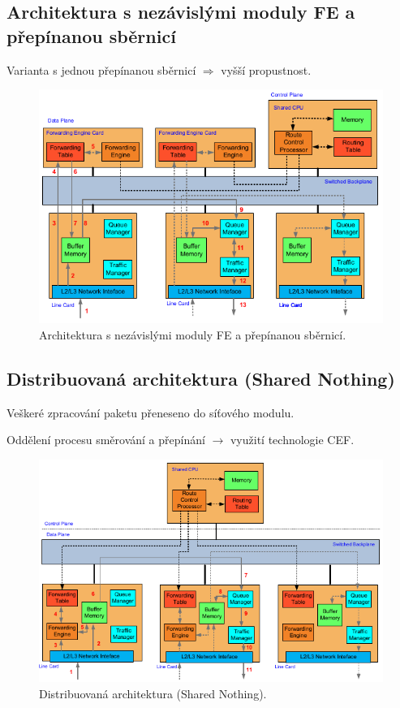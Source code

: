 \subsection{Architektura s nezávislými moduly FE a přepínanou sběrnicí}

\begin{compactitem}
    \item Varianta s jednou přepínanou sběrnicí $\Rightarrow$ vyšší propustnost.
\end{compactitem}

\begin{figure}[H]
    \centering
    \includegraphics[width=0.95\linewidth]{architektura_s_nezavislymi_moduly_fe_a_prepinanou_sbernici.pdf}
    \caption{Architektura s nezávislými moduly FE a přepínanou sběrnicí.}
\end{figure}

\subsection{Distribuovaná architektura (Shared Nothing)}

\begin{compactitem}
    \item Veškeré zpracování paketu přeneseno do síťového modulu.
    \item Oddělení procesu směrování a přepínání $\rightarrow$ využití technologie CEF.
\end{compactitem}

\begin{figure}[H]
    \centering
    \includegraphics[width=0.95\linewidth]{architektura_distribuovana.pdf}
    \caption{Distribuovaná architektura (Shared Nothing).}
\end{figure}
